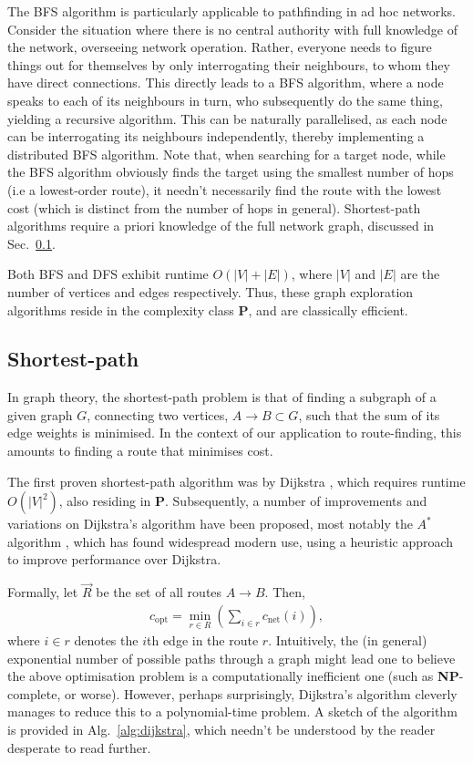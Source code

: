 The BFS algorithm is particularly applicable to pathfinding in ad hoc networks. Consider the situation where there is no central authority with full knowledge of the network, overseeing network operation. Rather, everyone needs to figure things out for themselves by only interrogating their neighbours, to whom they have direct connections. This directly leads to a BFS algorithm, where a node speaks to each of its neighbours in turn, who subsequently do the same thing, yielding a recursive algorithm. This can be naturally parallelised, as each node can be interrogating its neighbours independently, thereby implementing a distributed BFS algorithm. Note that, when searching for a target node, while the BFS algorithm obviously finds the target using the smallest number of hops (i.e a lowest-order route), it needn't necessarily find the route with the lowest cost (which is distinct from the number of hops in general). Shortest-path algorithms require a priori knowledge of the full network graph, discussed in Sec.~\ref{sec:shortest_path}.

Both BFS and DFS exhibit runtime \mbox{$O(|V|+|E|)$}, where $|V|$ and $|E|$ are the number of vertices and edges respectively. Thus, these graph exploration algorithms reside in the complexity class \textbf{P}, and are classically efficient.

%
%

\subsection{Shortest-path} \label{sec:shortest_path} 

In graph theory, the shortest-path problem is that of finding a subgraph of a given graph $G$, connecting two vertices, \mbox{$A\to B \subset G$}, such that the sum of its edge weights is minimised. In the context of our application to route-finding, this amounts to finding a route that minimises cost.

The first proven shortest-path algorithm was by Dijkstra \cite{bib:Dijkstra59}, which requires runtime $O(|V|^2)$, also residing in \textbf{P}. Subsequently, a number of improvements and variations on Dijkstra's algorithm have been proposed, most notably the $A^*$ algorithm \cite{bib:Astar}, which has found widespread modern use, using a heuristic approach to improve performance over Dijkstra.

Formally, let $\vec{R}$ be the set of all routes \mbox{$A\to B$}. Then,
\begin{align}
c_\text{opt} = \min_{r\in R} \left(\sum_{i\in r} c_\text{net}(i) \right),
\end{align}
where \mbox{$i\in r$} denotes the $i$th edge in the route $r$. Intuitively, the (in general) exponential number of possible paths through a graph might lead one to believe the above optimisation problem is a computationally inefficient one (such as \textbf{NP}-complete, or worse). However, perhaps surprisingly, Dijkstra's algorithm cleverly manages to reduce this to a polynomial-time problem. A sketch of the algorithm is provided in Alg.~\ref{alg:dijkstra}, which needn't be understood by the reader desperate to read further.


